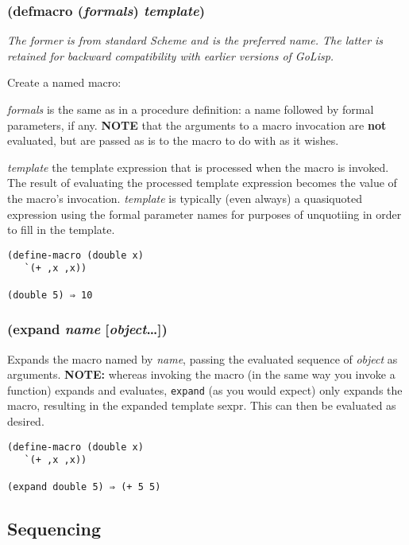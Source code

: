 \documentclass{article}
\begin{document}
\subsubsection{(defmacro (\emph{formals}) \emph{template})}

\emph{The former is from standard Scheme and is the preferred name. The latter is retained for
  backward compatibility with earlier versions of GoLisp.}

Create a named macro:

\emph{formals} is the same as in a procedure definition: a name followed by formal parameters,
if any. \textbf{NOTE} that the arguments to a macro invocation are \textbf{not} evaluated, but
are passed as is to the macro to do with as it wishes.

\emph{template} the template expression that is processed when the macro is invoked. The
result of evaluating the processed template expression becomes the value of the macro's
invocation. \emph{template} is typically (even always) a quasiquoted expression using the
formal parameter names for purposes of unquotiing in order to fill in the template.

\begin{verbatim}
(define-macro (double x)
   `(+ ,x ,x))

(double 5) ⇒ 10
\end{verbatim}

\subsubsection{(expand \emph{name} [\emph{object}\ldots{}])}

Expands the macro named by \emph{name}, passing the evaluated sequence of \emph{object} as
arguments. \textbf{NOTE:} whereas invoking the macro (in the same way you invoke a function)
expands and evaluates, \verb|expand| (as you would expect) only expands the macro, resulting
in the expanded template sexpr. This can then be evaluated as desired.

\begin{verbatim}
(define-macro (double x)
   `(+ ,x ,x))

(expand double 5) ⇒ (+ 5 5)
\end{verbatim}

\subsection{Sequencing}\label{sec:sequencing}
\end{document}
